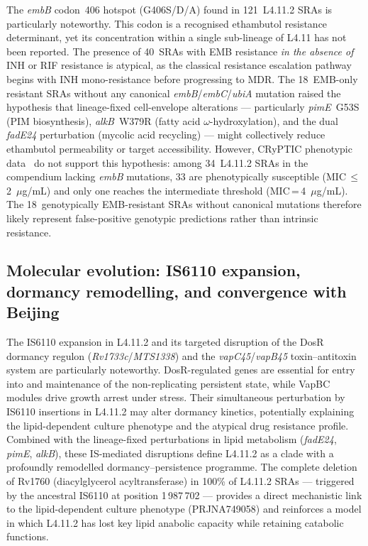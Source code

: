 \documentclass[11pt,a4paper]{article}
\newcommand{\lignee}[1]{\textsf{#1}}
\begin{document}
The \textit{embB} codon~406 hotspot (G406S/D/A) found in 121~\lignee{L4.11.2}
SRAs is particularly noteworthy.  This codon is a recognised
ethambutol resistance determinant, yet its concentration within a single
sub-lineage of \lignee{L4.11} has not been reported.  The presence
of 40~SRAs with EMB resistance \textit{in the absence of} INH or RIF
resistance is atypical, as the classical resistance escalation pathway
begins with INH mono-resistance before progressing to
MDR\@.  The 18~EMB-only resistant SRAs without any canonical
\textit{embB}/\textit{embC}/\textit{ubiA} mutation raised the hypothesis
that lineage-fixed cell-envelope alterations --- particularly
\textit{pimE}~G53S (PIM biosynthesis), \textit{alkB}~W379R (fatty acid
$\omega$-hydroxylation), and the dual \textit{fadE24} perturbation
(mycolic acid recycling) --- might collectively reduce ethambutol
permeability or target accessibility.  However, CRyPTIC phenotypic
data~\cite{cryptic2022} do not support this hypothesis: among
34~\lignee{L4.11.2} SRAs in the compendium lacking \textit{embB}
mutations, 33 are phenotypically susceptible
(MIC\,$\leq$\,2~$\mu$g/mL) and only one reaches the intermediate
threshold (MIC\,=\,4~$\mu$g/mL).  The 18~genotypically EMB-resistant
SRAs without canonical mutations therefore likely represent false-positive
genotypic predictions rather than intrinsic resistance.

\subsection{Molecular evolution: IS6110 expansion, dormancy remodelling, and convergence with Beijing}

The IS6110 expansion in \lignee{L4.11.2} and its targeted disruption of the DosR dormancy regulon
(\textit{Rv1733c}/\textit{MTS1338}) and the \textit{vapC45}/\textit{vapB45}
toxin--antitoxin system are particularly noteworthy.  DosR-regulated genes
are essential for entry into and maintenance of the non-replicating
persistent state, while VapBC modules drive growth arrest under stress.
Their simultaneous perturbation by IS6110 insertions in \lignee{L4.11.2} may
alter dormancy kinetics, potentially explaining the lipid-dependent culture
phenotype and the atypical drug resistance profile.  Combined with the
lineage-fixed perturbations in lipid metabolism (\textit{fadE24},
\textit{pimE}, \textit{alkB}), these IS-mediated disruptions define
\lignee{L4.11.2} as a clade with a profoundly remodelled
dormancy--persistence programme.  The complete deletion of Rv1760
(diacylglycerol acyltransferase) in 100\% of \lignee{L4.11.2}
SRAs --- triggered by the ancestral IS6110 at position 1\,987\,702 ---
provides a direct mechanistic link to the lipid-dependent culture
phenotype (PRJNA749058) and reinforces a model in which \lignee{L4.11.2}
has lost key lipid anabolic capacity while retaining catabolic functions.
\end{document}
